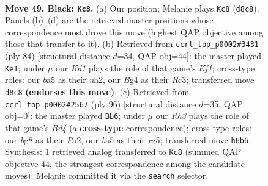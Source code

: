\documentclass[11pt]{article}
\begin{document}
\clearpage

\begin{figure}[p]\centering
\begin{subfigure}{0.46\textwidth}\centering
\resizebox{\linewidth}{!}{%
\newchessgame
\chessboard[
  setfen={3k2B1/8/7r/B7/5pbp/PP6/1K6/R5N1 b - - 1 49},
  showmover=false,
  pgfstyle=straightmove, color=movearrow, markmove={d8-c8}
]}
\caption{}
\end{subfigure}\hfill
\begin{subfigure}{0.46\textwidth}\centering
\resizebox{\linewidth}{!}{%
\newchessgame
\chessboard[
  setfen={8/3kp3/3p4/6rp/1R6/2R1P3/P6n/5K2 w - - 7 43},
  showmover=false,
  pgfstyle=straightmove, color=movearrow, markmove={f1-e1}
]}
\caption{}
\end{subfigure}
\\[4pt]
\begin{subfigure}{0.46\textwidth}\centering
\resizebox{\linewidth}{!}{%
\newchessgame
\chessboard[
  setfen={R7/8/p1P1k1p1/3p2r1/3B1b2/8/P4K2/8 w - - 3 49},
  showmover=false,
  pgfstyle=straightmove, color=movearrow, markmove={d4-b6}
]}
\caption{}
\end{subfigure}\hfill

\caption{\textbf{Move 49, Black: \texttt{Kc8}.} (a) Our position; Melanie plays \texttt{Kc8} (\texttt{d8c8}). Panels (b)--(d) are the retrieved master positions whose correspondence most drove this move (highest QAP objective among those that transfer to it). (b) Retrieved from \texttt{ccrl\_top\_p0002\#3431} (ply 84) [structural distance $d$=34, QAP obj=44]: the master played \texttt{Ke1}; under $\mu$ our \emph{Kd1} plays the role of that game's \emph{Kf1}; cross-type roles: our \emph{b}a5 as their \emph{n}h2, our \emph{B}g4 as their \emph{R}c3; transferred move \texttt{d8c8} \textbf{(endorses this move)}. (c) Retrieved from \texttt{ccrl\_top\_p0002\#2567} (ply 96) [structural distance $d$=35, QAP obj=0]: the master played \texttt{Bb6}; under $\mu$ our \emph{Rh3} plays the role of that game's \emph{Bd4} (a \textbf{cross-type} correspondence); cross-type roles: our \emph{b}g8 as their \emph{P}a2, our \emph{b}a5 as their \emph{r}g5; transferred move \texttt{h6b6}. Synthesis: 1 retrieved analog transferred to \texttt{Kc8} (summed QAP objective 44, the strongest correspondence among the candidate moves); Melanie committed it via the \texttt{search} selector.}
\label{fig:thought-m97}
\end{figure}

\clearpage
\end{document}
